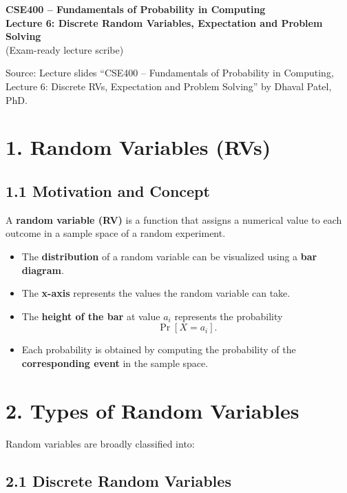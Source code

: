 \documentclass[12pt]{article}
\begin{document}
\begin{center}
\Large \textbf{CSE400 – Fundamentals of Probability in Computing} \\
\large \textbf{Lecture 6: Discrete Random Variables, Expectation and Problem Solving} \\
\normalsize (Exam-ready lecture scribe)
\end{center}

\vspace{1em}

Source: Lecture slides “CSE400 – Fundamentals of Probability in Computing, Lecture 6: Discrete RVs, Expectation and Problem Solving” by Dhaval Patel, PhD.

\section*{1. Random Variables (RVs)}

\subsection*{1.1 Motivation and Concept}

A \textbf{random variable (RV)} is a function that assigns a numerical value to each outcome in a sample space of a random experiment.

\begin{itemize}
\item The \textbf{distribution} of a random variable can be visualized using a \textbf{bar diagram}.
\item The \textbf{x-axis} represents the values the random variable can take.
\item The \textbf{height of the bar} at value $a_i$ represents the probability
\[
\Pr[X = a_i].
\]
\item Each probability is obtained by computing the probability of the \textbf{corresponding event} in the sample space.
\end{itemize}

\section*{2. Types of Random Variables}

Random variables are broadly classified into:

\subsection*{2.1 Discrete Random Variables}
\end{document}
